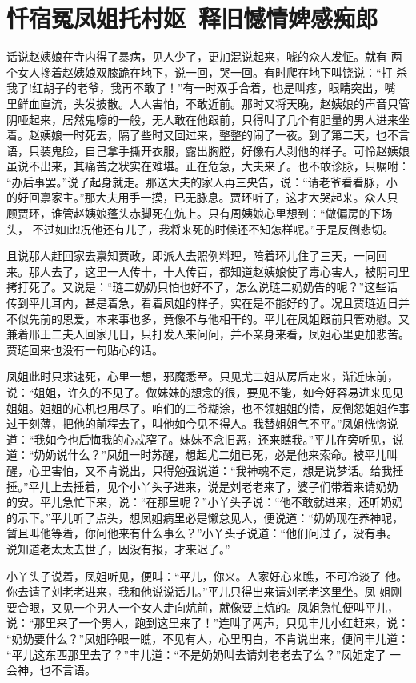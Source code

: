 \chapter{忏宿冤凤姐托村妪~释旧憾情婢感痴郎}

话说赵姨娘在寺内得了暴病，见人少了，更加混说起来，唬的众人发怔。就有
两个女人搀着赵姨娘双膝跪在地下，说一回，哭一回。有时爬在地下叫饶说：“打
杀我了!红胡子的老爷，我再不敢了！”有一时双手合着，也是叫疼，眼睛突出，嘴
里鲜血直流，头发披散。人人害怕，不敢近前。那时又将天晚，赵姨娘的声音只管
阴哑起来，居然鬼嚎的一般，无人敢在他跟前，只得叫了几个有胆量的男人进来坐
着。赵姨娘一时死去，隔了些时又回过来，整整的闹了一夜。到了第二天，也不言
语，只装鬼脸，自己拿手撕开衣服，露出胸膛，好像有人剥他的样子。可怜赵姨娘
虽说不出来，其痛苦之状实在难堪。正在危急，大夫来了。也不敢诊脉，只嘱咐：
“办后事罢。”说了起身就走。那送大夫的家人再三央告，说：“请老爷看看脉，小
的好回禀家主。”那大夫用手一摸，已无脉息。贾环听了，这才大哭起来。众人只
顾贾环，谁管赵姨娘蓬头赤脚死在炕上。只有周姨娘心里想到：“做偏房的下场头，
不过如此!况他还有儿子，我将来死的时候还不知怎样呢。”于是反倒悲切。

且说那人赶回家去禀知贾政，即派人去照例料理，陪着环儿住了三天，一同回
来。那人去了，这里一人传十，十人传百，都知道赵姨娘使了毒心害人，被阴司里
拷打死了。又说是：“琏二奶奶只怕也好不了，怎么说琏二奶奶告的呢？”这些话
传到平儿耳内，甚是着急，看着凤姐的样子，实在是不能好的了。况且贾琏近日并
不似先前的恩爱，本来事也多，竟像不与他相干的。平儿在凤姐跟前只管劝慰。又
兼着邢王二夫人回家几日，只打发人来问问，并不亲身来看，凤姐心里更加悲苦。
贾琏回来也没有一句贴心的话。

凤姐此时只求速死，心里一想，邪魔悉至。只见尤二姐从房后走来，渐近床前，
说：“姐姐，许久的不见了。做妹妹的想念的很，要见不能，如今好容易进来见见
姐姐。姐姐的心机也用尽了。咱们的二爷糊涂，也不领姐姐的情，反倒怨姐姐作事
过于刻薄，把他的前程去了，叫他如今见不得人。我替姐姐气不平。”凤姐恍惚说
道：“我如今也后悔我的心忒窄了。妹妹不念旧恶，还来瞧我。”平儿在旁听见，说
道：“奶奶说什么？”凤姐一时苏醒，想起尤二姐已死，必是他来索命。被平儿叫
醒，心里害怕，又不肯说出，只得勉强说道：“我神魂不定，想是说梦话。给我捶
捶。”平儿上去捶着，见个小丫头子进来，说是刘老老来了，婆子们带着来请奶奶
的安。平儿急忙下来，说：“在那里呢？”小丫头子说：“他不敢就进来，还听奶奶
的示下。”平儿听了点头，想凤姐病里必是懒怠见人，便说道：“奶奶现在养神呢，
暂且叫他等着，你问他来有什么事么？”小丫头子说道：“他们问过了，没有事。
说知道老太太去世了，因没有报，才来迟了。”

小丫头子说着，凤姐听见，便叫：“平儿，你来。人家好心来瞧，不可冷淡了
他。你去请了刘老老进来，我和他说说话儿。”平儿只得出来请刘老老这里坐。凤
姐刚要合眼，又见一个男人一个女人走向炕前，就像要上炕的。凤姐急忙便叫平儿，
说：“那里来了一个男人，跑到这里来了！”连叫了两声，只见丰儿小红赶来，说：
“奶奶要什么？”凤姐睁眼一瞧，不见有人，心里明白，不肯说出来，便问丰儿道：
“平儿这东西那里去了？”丰儿道：“不是奶奶叫去请刘老老去了么？”凤姐定了
一会神，也不言语。

